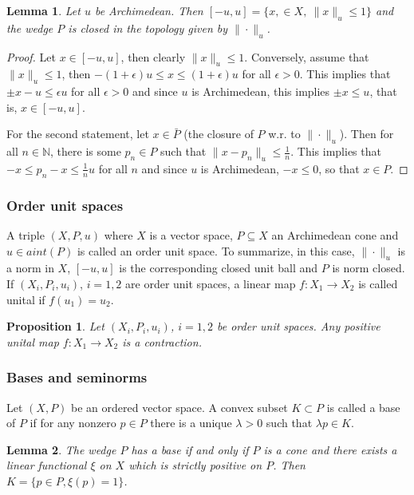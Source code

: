 \documentclass[12pt]{article}
\newtheorem{lemma}{Lemma}
\newtheorem{prop}{Proposition}
\theoremstyle{remark}
\newcommand{\<}{\langle}
\begin{document}
\begin{lemma} Let $u$ be Archimedean. Then $[-u,u]=\{x,\in X,\ \|x\|_u\le 1\}$ and the wedge $P$ is closed in the topology given by $\|\cdot\|_u$.

\end{lemma}

\begin{proof} Let $x\in [-u,u]$, then clearly $\|x\|_u\le 1$. Conversely, assume that $\|x\|_u\le 1$, then $-(1+\epsilon) u\le x\le (1+\epsilon) u$ for all $\epsilon>0$. 
This implies that $\pm x-u\le \epsilon u$ for all $\epsilon>0$ and since $u$ is Archimedean, this implies $\pm x\le u$, that is, $x\in [-u,u]$.

For the second statement, let $x\in \bar P$ (the closure of $P$ w.r. to $\|\cdot\|_u$). Then for all $n\in \mathbb N$, there is some $p_n\in P$ such that $\|x-p_n\|_u\le \tfrac1n$. This implies that $-x\le p_n-x\le \tfrac 1n u$ for all $n$ and since  $u$ is Archimedean, $-x\le 0$, so that $x\in P$.

\end{proof}

\subsubsection*{Order unit spaces}

A triple $(X,P,u)$ where $X$ is a vector space, $P\subseteq X$ an Archimedean  cone and $u\in aint(P)$ is called an order unit space. To summarize, in this case, 
$\|\cdot\|_u$ is a norm in $X$, $[-u,u]$ is the corresponding closed unit ball and $P$ is norm closed.
If $(X_i,P_i,u_i)$, $i=1,2$ are order unit spaces, a linear map $f:X_1\to X_2$ is called unital if $f(u_1)=u_2$.

\begin{prop} Let $(X_i,P_i,u_i)$, $i=1,2$ be order unit spaces. Any positive unital map $f:X_1\to X_2$ is a contraction.
\end{prop}

\subsubsection*{Bases and seminorms}

Let $(X,P)$ be an ordered vector space. A convex subset $K\subset P$ is called a base of $P$ if for any nonzero $p\in P$ there is a unique $\lambda>0$  such that 
$\lambda p\in K$.  


\begin{lemma} The wedge  $P$ has a base if and only if $P$ is a cone and there exists a linear functional $\xi$ on $X$ which is strictly positive on $P$. Then 
 $K=\{p\in P, \xi(p)=1\}$. 
\end{lemma}
\end{document}
